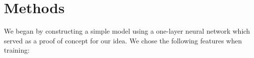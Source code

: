 \documentclass[10pt,twocolumn,letterpaper]{article}
\begin{document}
\section{Methods}



We began by constructing a simple model using a one-layer neural network which served as a proof of concept for our idea. We chose the following features when training:
\end{document}
